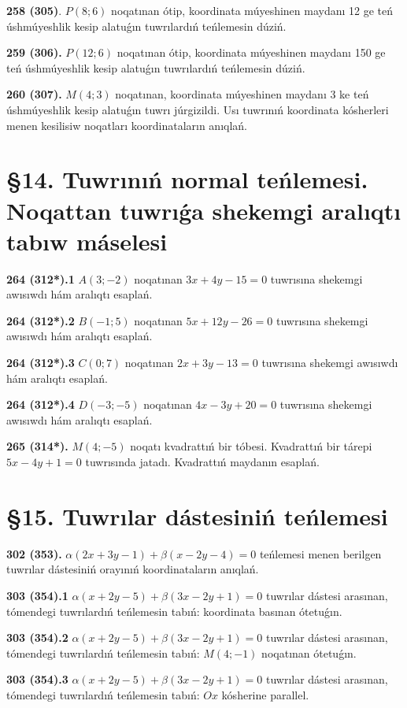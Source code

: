 \documentclass{article}
\begin{document}
\textbf{258 (305)}. $P(8;6)$ noqatınan ótip, koordinata múyeshinen 
maydanı 12 ge teń úshmúyeshlik kesip alatuǵın tuwrılardıń teńlemesin 
dúziń.

\textbf{259 (306).} $P(12;6)$ noqatınan ótip, koordinata múyeshinen 
maydanı 150 ge teń úshmúyeshlik kesip alatuǵın tuwrılardıń 
teńlemesin dúziń.

\textbf{260 (307).} $M(4;3)$ noqatınan, koordinata múyeshinen 
maydanı 3 ke teń úshmúyeshlik kesip alatuǵın tuwrı júrgizildi. 
Usı tuwrınıń koordinata kósherleri menen kesilisiw noqatları 
koordinataların anıqlań.

\section*{\S 14. Tuwrınıń normal teńlemesi. Noqattan tuwrıǵa shekemgi aralıqtı 
tabıw máselesi}

\textbf{264 (312*).1} $A(3;-2)$ noqatınan $3x+4y-15=0$ tuwrısına 
shekemgi awısıwdı hám aralıqtı esaplań.

\textbf{264 (312*).2} $B(-1;5)$ noqatınan $5x+12y-26=0$ tuwrısına 
shekemgi awısıwdı hám aralıqtı esaplań.

\textbf{264 (312*).3} $C(0;7)$ noqatınan $2x+3y-13=0$ tuwrısına 
shekemgi awısıwdı hám aralıqtı esaplań.

\textbf{264 (312*).4} $D(-3;-5)$ noqatınan $4x-3y+20=0$ tuwrısına 
shekemgi awısıwdı hám aralıqtı esaplań.

\textbf{265 (314*).} $M(4;-5)$ noqatı kvadrattıń bir tóbesi. 
Kvadrattıń bir tárepi $5x-4y+1=0$ tuwrısında jatadı. 
Kvadrattıń maydanın esaplań.

\section*{\S 15. Tuwrılar dástesiniń teńlemesi}

\textbf{302 (353).} $\alpha(2x+3y-1)+\beta(x-2y-4)=0$ teńlemesi
menen berilgen tuwrılar dástesiniń orayınıń koordinataların anıqlań.

\textbf{303 (354).1} $\alpha(x+2y-5)+\beta(3x-2y+1)=0$ tuwrılar
dástesi arasınan, tómendegi tuwrılardıń teńlemesin tabıń:
koordinata basınan ótetuǵın.

\textbf{303 (354).2} $\alpha(x+2y-5)+\beta(3x-2y+1)=0$ tuwrılar
dástesi arasınan, tómendegi tuwrılardıń teńlemesin tabıń:
$M(4;-1)$ noqatınan ótetuǵın.

\textbf{303 (354).3} $\alpha(x+2y-5)+\beta(3x-2y+1)=0$ tuwrılar
dástesi arasınan, tómendegi tuwrılardıń teńlemesin tabıń:
$Ox$ kósherine parallel.
\end{document}
